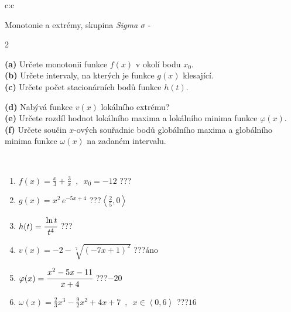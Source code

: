 \documentclass[10pt]{report}
\begin{document}
\newpage
\thispagestyle{empty}
\begin{tabular}{c:c}
\begin{minipage}[c][104.5mm][t]{0.5\linewidth}
\begin{center}
\vspace{7mm}
{\huge Monotonie a extrémy, skupina \textit{Sigma $\sigma$} -}\\[5mm]
\begin{minipage}{0.95\linewidth}
\begin{center}
{\small \begin{multicols}{2} \raggedright
\textbf{(a)} Určete monotonii funkce \(f(x)\) v okolí bodu \(x_0\). \\[1mm]
\textbf{(b)} Určete intervaly, na kterých je funkce \(g(x)\) klesající. \\[1mm]
\textbf{(c)} Určete počet stacionárních bodů funkce \(h(t)\). \par \columnbreak
\textbf{(d)} Nabývá funkce \(v(x)\) lokálního extrému? \\[1mm]
\textbf{(e)} Určete rozdíl hodnot lokálního maxima a lokálního minima funkce \(\varphi(x)\). \\[1mm]
\textbf{(f)} Určete součin \(x\)-ových souřadnic bodů globálního maxima a globálního minima funkce \(\omega(x)\) na zadaném intervalu. \\[1mm]
\end{multicols}
}
\end{center}
\end{minipage}
\\[4mm]
\begin{minipage}{0.79\linewidth}
\begin{center}
\begin{varwidth}{\linewidth}
\begin{enumerate}
\normalsize
\item $f(x)=\frac{x}{3}+\frac{3}{x} \enspace , \enspace x_0=-12$\quad \dotfill\; ???\;\dotfill \quad {}
\item $g(x)=x^2\, e^{-5x+4}$\quad \dotfill\; ???\;\dotfill \quad $\left\langle\frac{2}{5} , 0\right\rangle$
\item $h(t)=\cfrac{\ln t}{t^4}$\quad \dotfill\; ???\;\dotfill {}
\item $v(x)=-2-\sqrt[7]{(-7x+1)^2}$\quad \dotfill\; ???\;\dotfill \quad $\text{áno}$
\item $\varphi(x)=\cfrac{x^2-5x-11}{x+4}$\quad \dotfill\; ???\;\dotfill \quad $-20$
\item $\omega(x)=\frac{2}{3}x^3-\frac{9}{2}x^2+4x+7 \enspace , \enspace x\in\left\langle0 , 6\right\rangle$\quad \dotfill\; ???\;\dotfill \quad $16$

\end{enumerate}
\end{varwidth}
\end{center}
\end{minipage}
\end{center}
\end{minipage}
\end{tabular}
\end{document}
